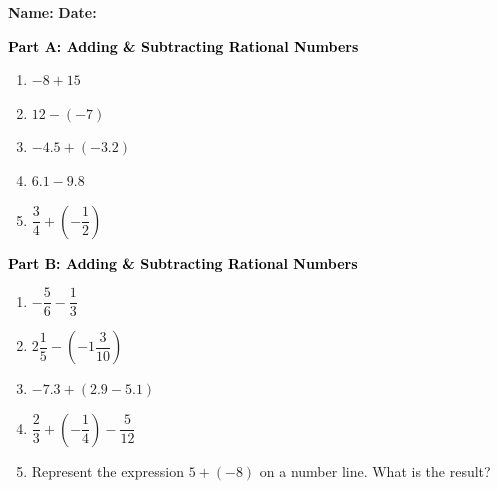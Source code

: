 \documentclass[12pt, letterpaper, fleqn]{article}
\begin{document}
\textbf{Name:} \underline{\hspace{5cm}}
\hfill
\textbf{Date:} \underline{\hspace{3cm}}\\

\begin{tcolorbox}[colback=customteal!20]
\large\textcolor{black}{\textbf{Part A: Adding \& Subtracting Rational Numbers}}
\end{tcolorbox}

\vspace{3mm}

\begin{enumerate}[itemsep=5.5cm, leftmargin=0.6cm]
\item $-8 + 15$
\vspace{1cm}
\item $12 - (-7)$
\vspace{1cm}
\item $-4.5 + (-3.2)$
\vspace{1cm}
\item $6.1 - 9.8$
\vspace{1cm}
\item $\dfrac{3}{4} + \left(-\dfrac{1}{2}\right)$
\vspace{1cm}
\end{enumerate}

\newpage

\begin{tcolorbox}[colback=customteal!20]
\large\textcolor{black}{\textbf{Part B: Adding \& Subtracting Rational Numbers}}
\end{tcolorbox}

\vspace{3mm}

\begin{enumerate}[itemsep=5.5cm, leftmargin=0.6cm, resume]
\item $-\dfrac{5}{6} - \dfrac{1}{3}$
\vspace{1cm}
\item $2\dfrac{1}{5} - \left(-1\dfrac{3}{10}\right)$
\vspace{1cm}
\item $-7.3 + (2.9 - 5.1)$
\vspace{1cm}
\item $\dfrac{2}{3} + \left(-\dfrac{1}{4}\right) - \dfrac{5}{12}$
\vspace{1cm}
\item Represent the expression $5 + (-8)$ on a number line. What is the result?
\vspace{2.5cm}
\end{enumerate}
\end{document}
